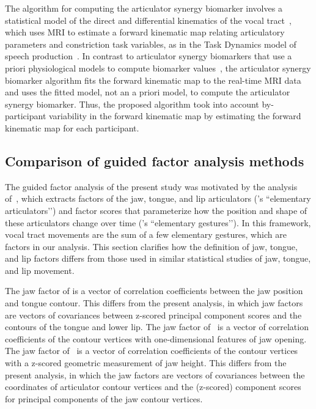 \documentclass[reprint]{JASAnew}\usepackage[]{graphicx}\usepackage[]{color}
\begin{document}
The algorithm for computing the articulator synergy biomarker involves a statistical model of the direct and differential kinematics of the vocal tract~\citep{lammert2013statistical}, which uses MRI to estimate a forward kinematic map relating articulatory parameters and constriction task variables, as in the Task Dynamics model of speech production~\citep{saltzman1989dynamical}. In contrast to articulator synergy biomarkers that use a priori physiological models to compute biomarker values~\citep[e.g., articulator synergy biomarkers of kinetic parameters from dynamic contrast-enhanced MRI,][]{aerts2008system},  the articulator synergy biomarker algorithm fits the forward kinematic map to the real-time MRI data and uses the fitted model, not an a priori model, to compute the articulator synergy biomarker. Thus, the proposed algorithm took into account by-participant variability in the forward kinematic map by estimating the forward kinematic map for each participant. 


\subsection{Comparison of guided factor analysis methods}

The guided factor analysis of the present study was motivated by the analysis of~\citet{maeda1990compensatory}, which extracts factors of the jaw, tongue, and lip articulators (\citeauthor{maeda1990compensatory}’s ``elementary articulators’’) and factor scores that parameterize how the position and shape of these articulators change over time (\citeauthor{maeda1990compensatory}’s ``elementary gestures’’). In this framework, vocal tract movements are the sum of a few elementary gestures, which are factors in our analysis. This section clarifies how the definition of jaw, tongue, and lip factors differs from those used in similar statistical studies of jaw, tongue, and lip movement.

The jaw factor of \citet{maeda1990compensatory} is a vector of correlation coefficients between the jaw position and tongue contour. This differs from the present analysis, in which jaw factors are vectors of covariances between z-scored principal component scores and the contours of the tongue and lower lip. The jaw factor of~\citet{cai2009articulatory} is a vector of correlation coefficients of the contour vertices with one-dimensional features of jaw opening. The jaw factor of~\citet{badin2006three} is a vector of correlation coefficients of the contour vertices with a z-scored geometric measurement of jaw height. This differs from the present analysis, in which the jaw factors are vectors of covariances between the coordinates of articulator contour vertices and the (z-scored) component scores for principal components of the jaw contour vertices.
\end{document}
